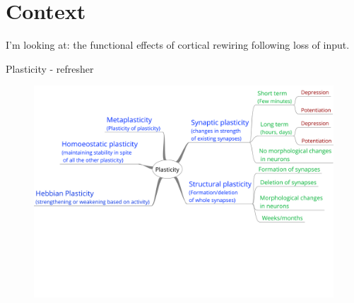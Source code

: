 \section{Context}
\begin{frame}{I'm looking at:}
  the \alert{functional effects} of cortical rewiring following loss of input.
\end{frame}
\begin{frame}{Plasticity - refresher}
  \begin{figure}
    \includegraphics[keepaspectratio,width=\textwidth]{99_images/Plasticity}
  \end{figure}
\end{frame}

